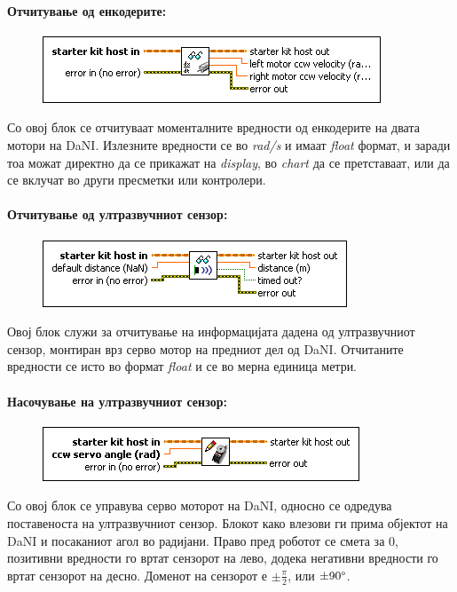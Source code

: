 \documentclass{article}
\begin{document}
\paragraph{Отчитување од енкодерите:\\}
\begin{figure}[h]
\includegraphics[width=0.45\linewidth]{read_dc.png}
\raggedright
\end{figure}

Со овој блок се отчитуваат моменталните вредности од енкодерите на двата мотори на DaNI. Излезните вредности се во \textit{rad/s} и  имаат \textit{float} формат, и заради тоа можат директно да се прикажат на \textit{display}, во \textit{chart} да се претставаат, или да се вклучат во други пресметки или контролери.

\paragraph{Отчитување од ултразвучниот сензор:\\}
\begin{figure}[h]
\includegraphics[width=0.45\linewidth]{read_ping.png}
\raggedright
\end{figure}

Овој блок служи за отчитување на информацијата дадена од ултразвучниот сензор, монтиран врз серво мотор на предниот дел од DaNI. Отчитаните вредности се исто во формат \textit{float} и се во мерна единица метри.

\paragraph{Насочување на ултразвучниот сензор:\\}
\begin{figure}[h]
\includegraphics[width=0.45\linewidth]{write_servo.png}
\raggedright
\end{figure}  
Со овој блок се управува серво моторот на DaNI, односно се одредува поставеноста на ултразвучниот сензор. Блокот како влезови ги прима објектот на DaNI и посаканиот агол во радијани. Право пред роботот се смета за 0, позитивни вредности го вртат сензорот на лево, додека негативни вредности го вртат сензорот на десно. Доменот на сензорот е $ \pm \frac{\pi}{2}$, или $\pm 90 \degree$.
 
\end{document}
